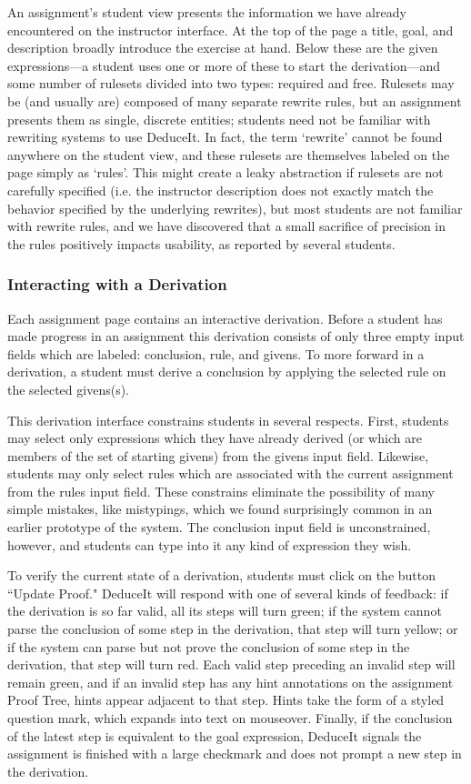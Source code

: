 \documentclass{sigchi}
\begin{document}
An assignment's student view presents the information we have already encountered on the instructor interface. At the top of the page a title, goal, and description broadly introduce the exercise at hand. Below these are the given expressions---a student uses one or more of these to start the derivation---and some number of rulesets divided into two types: required and free. Rulesets may be (and usually are) composed of many separate rewrite rules, but an assignment presents them as single, discrete entities; students need not be familiar with rewriting systems to use DeduceIt. In fact, the term `rewrite' cannot be found anywhere on the student view, and these rulesets are themselves labeled on the page simply as `rules'. This might create a leaky abstraction if rulesets are not carefully specified (i.e. the instructor description does not exactly match the behavior specified by the underlying rewrites), but most students are not familiar with rewrite rules, and we have discovered that a small sacrifice of precision in the rules positively impacts usability, as reported by several students.

\subsubsection{Interacting with a Derivation}

Each assignment page contains an interactive derivation. Before a student has made progress in an assignment this derivation consists of only three empty input fields which are labeled: conclusion, rule, and givens. To more forward in a derivation, a student must derive a conclusion by applying the selected rule on the selected givens(s). 

This derivation interface constrains students in several respects. First, students may select only expressions which they have already derived (or which are members of the set of starting givens) from the givens input field. Likewise, students may only select rules which are associated with the current assignment from the rules input field. These constrains eliminate the possibility of many simple mistakes, like mistypings, which we found surprisingly common in an earlier prototype of the system. The conclusion input field is unconstrained, however, and students can type into it any kind of expression they wish.

To verify the current state of a derivation, students must click on the button ``Update Proof." DeduceIt will respond with one of several kinds of feedback: if the derivation is so far valid, all its steps will turn green; if the system cannot parse the conclusion of some step in the derivation, that step will turn yellow; or if the system can parse but not prove the conclusion of some step in the derivation, that step will turn red. Each valid step preceding an invalid step will remain green, and if an invalid step has any hint annotations on the assignment Proof Tree, hints appear adjacent to that step. Hints take the form of a styled question mark, which expands into text on mouseover. Finally, if the conclusion of the latest step is equivalent to the goal expression, DeduceIt signals the assignment is finished with a large checkmark and does not prompt a new step in the derivation.
\end{document}
